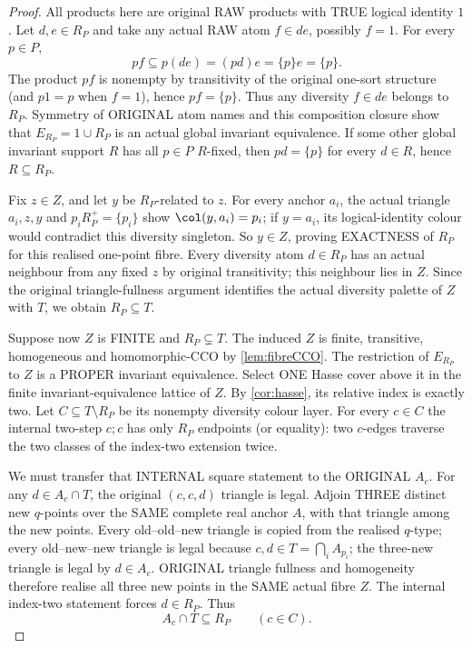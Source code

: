 \begin{proof}
All products here are original
RAW products with TRUE logical
identity $1$. Let $d,e\in R_P$
and take any actual RAW atom
$f\in de$, possibly $f=1$.
For every $p\in P$,
\[
 pf\subseteq p(de)=(pd)e=\{p\}e=\{p\}.
\]
The product $pf$ is nonempty by
transitivity of the original
one-sort structure (and $p1=p$
when $f=1$), hence
$pf=\{p\}$. Thus any diversity
$f\in de$ belongs to $R_P$.
Symmetry of ORIGINAL atom names
and this composition closure
show that $E_{R_P}=1\cup R_P$
is an actual global invariant
equivalence. If some other global
invariant support $R$ has all
$p\in P$ $R$-fixed, then
$pd=\{p\}$ for every
$d\in R$, hence $R\subseteq R_P$.

Fix $z\in Z$, and let $y$ be
$R_P$-related to $z$. For every
anchor $a_i$, the actual
triangle $a_i,z,y$ and
$p_iR_P^+=\{p_i\}$ show
$\col(y,a_i)=p_i$; if
$y=a_i$, its logical-identity
colour would contradict this
diversity singleton.
So $y\in Z$, proving
EXACTNESS of $R_P$ for this
realised one-point fibre.
Every diversity atom $d\in R_P$
has an actual neighbour from
any fixed $z$ by original
transitivity; this neighbour
lies in $Z$. Since the
original triangle-fullness
argument identifies the
actual diversity palette of
$Z$ with $T$, we obtain
$R_P\subseteq T$.

Suppose now $Z$ is FINITE
and $R_P\subsetneq T$.
The induced $Z$ is finite,
transitive, homogeneous
and homomorphic-CCO by
\cref{lem:fibreCCO}.
The restriction of $E_{R_P}$
to $Z$ is a PROPER invariant
equivalence. Select ONE
Hasse cover above it in the
finite invariant-equivalence
lattice of $Z$.
By \cref{cor:hasse}, its
relative index is exactly
two. Let $C\subseteq
T\setminus R_P$ be its
nonempty diversity colour
layer. For every $c\in C$
the internal two-step
$c;c$ has only $R_P$
endpoints (or equality):
two $c$-edges traverse
the two classes of the
index-two extension twice.

We must transfer that
INTERNAL square statement
to the ORIGINAL $A_c$.
For any $d\in A_c\cap T$,
the original $(c,c,d)$
triangle is legal.
Adjoin THREE distinct new
$q$-points over the SAME
complete real anchor $A$,
with that triangle among
the new points.
Every old--old--new triangle
is copied from the realised
$q$-type; every
old--new--new triangle is
legal because $c,d\in
T=\bigcap_i A_{p_i}$;
the three-new triangle is
legal by $d\in A_c$.
ORIGINAL triangle fullness
and homogeneity therefore
realise all three new points
in the SAME actual fibre $Z$.
The internal index-two
statement forces $d\in R_P$.
Thus
\[
                         A_c\cap T\subseteq R_P
                       \qquad(c\in C).
\]


\end{proof}
